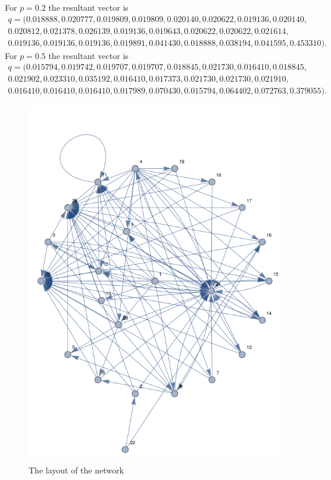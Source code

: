 \documentclass{unswmaths}
\begin{document}
For $ p = 0.2 $ the resultant vector is
\begin{align*}
    q = (   0.018888,
   0.020777,
   0.019809,
   0.019809,
   0.020140,
   0.020622,
   0.019136,
   0.020140,\\
   0.020812,
   0.021378,
   0.026139,
   0.019136,
   0.019643,
   0.020622,
   0.020622,
   0.021614,\\
   0.019136,
   0.019136,
   0.019136,
   0.019891,
   0.041430,
   0.018888,
   0.038194,
   0.041595,
   0.453310
).
\end{align*}
For $ p = 0.5 $ the resultant vector is
\begin{align*}
    q = (   0.015794,
   0.019742,
   0.019707,
   0.019707,
   0.018845,
   0.021730,
   0.016410,
   0.018845,\\
   0.021902,
   0.023310,
   0.035192,
   0.016410,
   0.017373,
   0.021730,
   0.021730,
   0.021910,\\
   0.016410,
   0.016410,
   0.016410,
   0.017989,
   0.070430,
   0.015794,
   0.064402,
   0.072763,
   0.379055
).
\end{align*}
\begin{figure}[h]
    \includegraphics[scale=0.5]{Graph}
    \caption{The layout of the network}
\end{figure}
\end{document}
